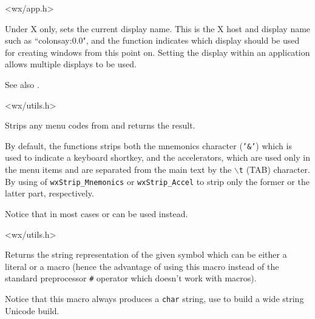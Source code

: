 <wx/app.h>


\label{wxsetdisplayname}


Under X only, sets the current display name. This is the X host and display name such
as ``colonsay:0.0", and the function indicates which display should be used for creating
windows from this point on. Setting the display within an application allows multiple
displays to be used.

See also .


<wx/utils.h>


\label{wxstripmenucodes}


Strips any menu codes from  and returns the result.

By default, the functions strips both the mnemonics character (\texttt{'\&'})
which is used to indicate a keyboard shortkey, and the accelerators, which are
used only in the menu items and are separated from the main text by the
\texttt{$\backslash$t} (TAB) character. By using  of
\texttt{wxStrip\_Mnemonics} or \texttt{wxStrip\_Accel} to strip only the former
or the latter part, respectively.

Notice that in most cases
 or
 can be used instead.


<wx/utils.h>


\label{wxstringize}


Returns the string representation of the given symbol which can be either a
literal or a macro (hence the advantage of using this macro instead of the
standard preprocessor \texttt{\#} operator which doesn't work with macros).

Notice that this macro always produces a \texttt{char} string, use 
 to build a wide string Unicode build.


